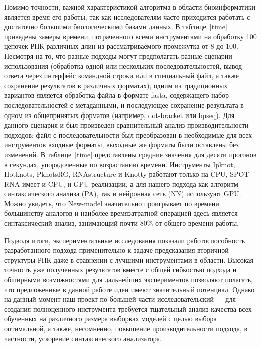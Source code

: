 Помимо точности, важной характеристикой алгоритма в области биоинформатики является время его работы, так как исследователям часто приходится работать с достаточно большими биологическими базами данных. В таблице~\ref{time} приведены замеры времени, потраченного всеми инструментами на обработку 100 цепочек РНК различных длин из рассматриваемого промежутка от 8 до 100. Несмотря на то, что разные подходы могут предполагать разные сценарии использования (обработка одной или нескольких последовательностей, вывод ответа через интерфейс командной строки или в специальный файл, а также сохранение результатов в различных форматах), одним из традиционных вариантов является обработка файла в формате fasta, содержащего набор последовательностей с метаданными, и последующее сохранение результата в одном из общепринятых форматов (например, dot-bracket или bpseq). Для данного сценария и был произведен сравнительный анализ производительности подходов: файл с последовательности был преобразован в необходимые для всех инструментов входные форматы, выходные же форматы были оставлены без изменений. В таблице~\ref{time} представлены средние значения для десяти прогонов в секундах, упорядоченные по возрастанию времени. Инструменты Ipknot, Hotknots, PknotsRG, RNAstructure и Knotty работают только на CPU, SPOT-RNA имеет и CPU, и GPU-реализации, а для нашего подхода как алгоритм синтаксического анализа (PA), так и нейронная сеть (NN) используют GPU. Можно увидеть, что New-model значительно проигрывает по времени большинству аналогов и наиболее времязатратной операцией здесь является синтаксический анализ, занимающий почти 80\% от общего времени работы.



Подводя итоги, экспериментальные исследования показали работоспособность разработанного подхода применительно к задаче предсказания вторичной структуры РНК даже в сравнении с лучшими инструментами в области. Высокая точность уже полученных результатов вместе с общей гибкостью подхода и обширными возможностями для дальнейших экспериментов позволяют полагать, что предложенные в данной работе идеи имеют значительный потенциал. Однако на данный момент наш проект по большей части исследовательский --- для создания полноценного инструмента требуется тщательный анализ качества всех обученных на различного размера выборках моделей с целью выбора оптимальной, а также, несомненно, повышение производительности подхода, в частности, ускорение синтаксического анализатора.